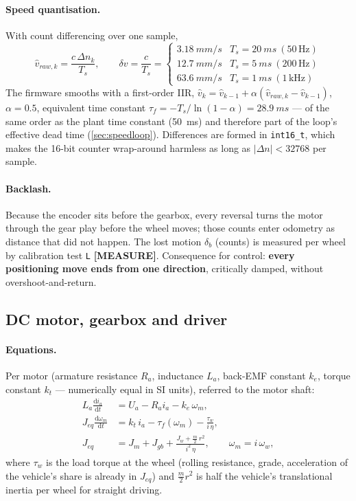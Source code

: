 \documentclass[11pt,a4paper]{article}
\newcommand{\mk}[2]{\textsf{\scriptsize\bfseries\colorbox{#1bg}{\color{#1}[#2]}}}
\newcommand{\MEASURE}{\mk{warn}{MEASURE}}
\newcommand{\code}[1]{\texttt{\small #1}}
\begin{document}
\paragraph{Speed quantisation.} With count differencing over one sample,
\begin{equation}
\hat v_{raw,k}=\frac{c\,\Delta n_k}{T_s},\qquad
\delta v = \frac{c}{T_s}=
\begin{cases}
\qty{3.18}{mm/s} & T_s=\qty{20}{ms}\ (50\,\text{Hz})\\
\qty{12.7}{mm/s} & T_s=\qty{5}{ms}\ (200\,\text{Hz})\\
\qty{63.6}{mm/s} & T_s=\qty{1}{ms}\ (1\,\text{kHz})
\end{cases}
\end{equation}
The firmware smooths with a first-order IIR, $\hat v_k=\hat v_{k-1}+\alpha(\hat
v_{raw,k}-\hat v_{k-1})$, $\alpha=0.5$, equivalent time constant
$\tau_f=-T_s/\ln(1-\alpha)=\qty{28.9}{ms}$ --- of the same order as the plant
time constant (\qty{50}{ms}) and therefore part of the loop's effective dead time
(\cref{sec:speedloop}). Differences are formed in \code{int16\_t}, which makes the
16-bit counter wrap-around harmless as long as $|\Delta n|<32768$ per sample.

\paragraph{Backlash.} Because the encoder sits before the gearbox, every reversal
turns the motor through the gear play before the wheel moves; those counts enter
odometry as distance that did not happen. The lost motion $\delta_b$ (counts)
is measured per wheel by calibration test \code{L} \MEASURE. Consequence for
control: \textbf{every positioning move ends from one direction}, critically
damped, without overshoot-and-return.

\subsection{DC motor, gearbox and driver}\label{sec:motor}

\paragraph{Equations.} Per motor (armature resistance $R_a$, inductance $L_a$,
back-EMF constant $k_e$, torque constant $k_t$ --- numerically equal in SI
units), referred to the motor shaft:
\begin{align}
L_a\frac{\mathrm d i_a}{\mathrm dt} &= U_a - R_a i_a - k_e\,\omega_m,\label{eq:elec}\\
J_{eq}\frac{\mathrm d\omega_m}{\mathrm dt} &= k_t\,i_a - \tau_f(\omega_m) - \frac{\tau_{w}}{i\,\eta},\label{eq:mech}\\
J_{eq} &= J_m + J_{gb} + \frac{J_w + \tfrac m2\,r^2}{i^2\,\eta},\qquad \omega_m = i\,\omega_w,
\end{align}
where $\tau_w$ is the load torque at the wheel (rolling resistance, grade,
acceleration of the vehicle's share is already in $J_{eq}$) and $\tfrac m2r^2$ is
half the vehicle's translational inertia per wheel for straight driving.
\end{document}
